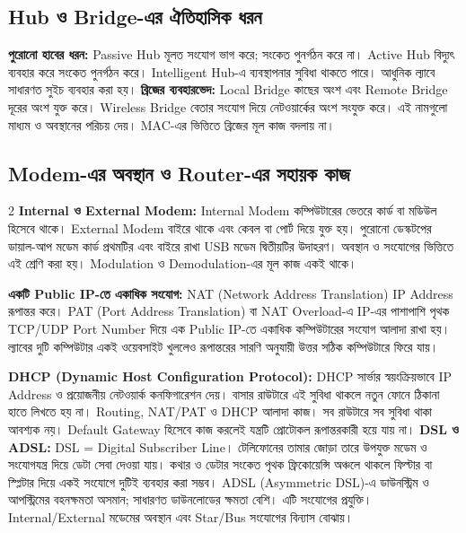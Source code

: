 \par{}
\subsection{Hub ও Bridge-এর ঐতিহাসিক ধরন}
\textbf{পুরোনো হাবের ধরন:} Passive Hub মূলত সংযোগ ভাগ করে; সংকেত পুনর্গঠন করে না। Active Hub বিদ্যুৎ ব্যবহার করে সংকেত পুনর্গঠন করে। Intelligent Hub-এ ব্যবস্থাপনার সুবিধা থাকতে পারে। আধুনিক ল্যাবে সাধারণত সুইচ ব্যবহার করা হয়।
\textbf{ব্রিজের ব্যবহারভেদ:} Local Bridge কাছের অংশ এবং Remote Bridge দূরের অংশ যুক্ত করে। Wireless Bridge বেতার সংযোগ দিয়ে নেটওয়ার্কের অংশ সংযুক্ত করে। এই নামগুলো মাধ্যম ও অবস্থানের পরিচয় দেয়। MAC-এর ভিত্তিতে ব্রিজের মূল কাজ বদলায় না।

\subsection{Modem-এর অবস্থান ও Router-এর সহায়ক কাজ}
\begin{multicols}{2}
\textbf{Internal ও External Modem:} Internal Modem কম্পিউটারের ভেতরে কার্ড বা মডিউল হিসেবে থাকে। External Modem বাইরে থাকে এবং কেবল বা পোর্ট দিয়ে যুক্ত হয়। পুরোনো ডেস্কটপের ডায়াল-আপ মডেম কার্ড প্রথমটির এবং বাইরে রাখা USB মডেম দ্বিতীয়টির উদাহরণ। অবস্থান ও সংযোগের ভিত্তিতে এই শ্রেণি করা হয়। Modulation ও Demodulation-এর মূল কাজ একই থাকে।\par
\textbf{একটি Public IP-তে একাধিক সংযোগ:} NAT (Network Address Translation) IP Address রূপান্তর করে। PAT (Port Address Translation) বা NAT Overload-এ IP-এর পাশাপাশি পৃথক TCP/UDP Port Number দিয়ে এক Public IP-তে একাধিক কম্পিউটারের সংযোগ আলাদা রাখা হয়। ল্যাবের দুটি কম্পিউটার একই ওয়েবসাইট খুললেও রূপান্তরের সারণি অনুযায়ী উত্তর সঠিক কম্পিউটারে ফিরে যায়।\par
\end{multicols}
\textbf{DHCP (Dynamic Host Configuration Protocol):} DHCP সার্ভার স্বয়ংক্রিয়ভাবে IP Address ও প্রয়োজনীয় নেটওয়ার্ক কনফিগারেশন দেয়। বাসার রাউটারে এই সুবিধা থাকলে নতুন ফোনে ঠিকানা হাতে লিখতে হয় না। Routing, NAT/PAT ও DHCP আলাদা কাজ। সব রাউটারে সব সুবিধা থাকা আবশ্যক নয়। Default Gateway হিসেবে কাজ করলেই যন্ত্রটি প্রোটোকল রূপান্তরকারী হয়ে যায় না।
\textbf{DSL ও ADSL:} DSL = Digital Subscriber Line। টেলিফোনের তামার জোড়া তারে উপযুক্ত মডেম ও সংযোগযন্ত্র দিয়ে ডেটা সেবা দেওয়া যায়। কথার ও ডেটার সংকেত পৃথক ফ্রিকোয়েন্সি অঞ্চলে থাকলে ফিল্টার বা স্প্লিটার দিয়ে একই সংযোগে দুটিই ব্যবহার করা সম্ভব। ADSL (Asymmetric DSL)-এ ডাউনস্ট্রিম ও আপস্ট্রিমের বহনক্ষমতা অসমান; সাধারণত ডাউনলোডের ক্ষমতা বেশি। এটি সংযোগের প্রযুক্তি। Internal/External মডেমের অবস্থান এবং Star/Bus সংযোগের বিন্যাস বোঝায়।

